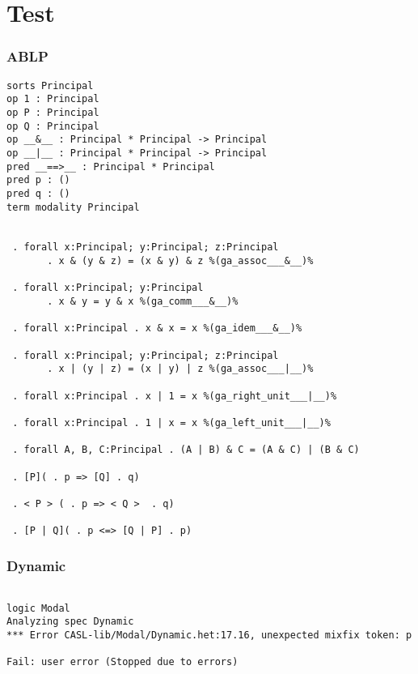 \documentclass[11pt,a4paper]{article}
\begin{document}
\part*{Test}
\section*{ABLP}
\begin{verbatim}
sorts Principal
op 1 : Principal
op P : Principal
op Q : Principal
op __&__ : Principal * Principal -> Principal
op __|__ : Principal * Principal -> Principal
pred __==>__ : Principal * Principal
pred p : ()
pred q : ()
term modality Principal


 . forall x:Principal; y:Principal; z:Principal
       . x & (y & z) = (x & y) & z %(ga_assoc___&__)%

 . forall x:Principal; y:Principal
       . x & y = y & x %(ga_comm___&__)%

 . forall x:Principal . x & x = x %(ga_idem___&__)%

 . forall x:Principal; y:Principal; z:Principal
       . x | (y | z) = (x | y) | z %(ga_assoc___|__)%

 . forall x:Principal . x | 1 = x %(ga_right_unit___|__)%

 . forall x:Principal . 1 | x = x %(ga_left_unit___|__)%

 . forall A, B, C:Principal . (A | B) & C = (A & C) | (B & C)

 . [P]( . p => [Q] . q)

 . < P > ( . p => < Q >  . q)

 . [P | Q]( . p <=> [Q | P] . p)

\end{verbatim}

\section*{Dynamic}
\begin{verbatim}

logic Modal
Analyzing spec Dynamic
*** Error CASL-lib/Modal/Dynamic.het:17.16, unexpected mixfix token: p

Fail: user error (Stopped due to errors)

\end{verbatim}
\end{document}
